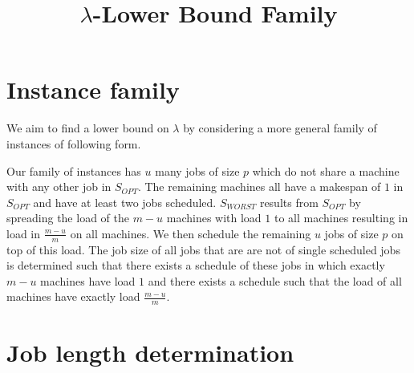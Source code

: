 \documentclass[11pt]{article}
\title{$\lambda$-Lower Bound Family}
\author{}
\date{}
\begin{document}
\maketitle

\section{Instance family}

We aim to find a lower bound on $\lambda$ by considering a more general family of instances of following form.

Our family of instances has $u$ many jobs of size $p$ which do not share a machine with any other job in $S_{OPT}$. The remaining machines all have a makespan of  $1$ in 
$S_{OPT}$ and have at least two jobs scheduled. $S_{WORST}$ results from $S_{OPT}$ by spreading the load of the $m-u$ machines with load $1$ to all machines resulting in load in $\frac{m-u}{m}$ on all machines. 
We then schedule the remaining $u$ jobs of size $p$ on top of this load.
The job size of all jobs that are are not of single scheduled jobs is determined such that there exists a schedule of these jobs in which exactly $m-u$ machines have load $1$ and there exists a schedule such that the load of all machines have exactly load $\frac{m-u}{m}$.        

\section{Job length determination}
\end{document}
